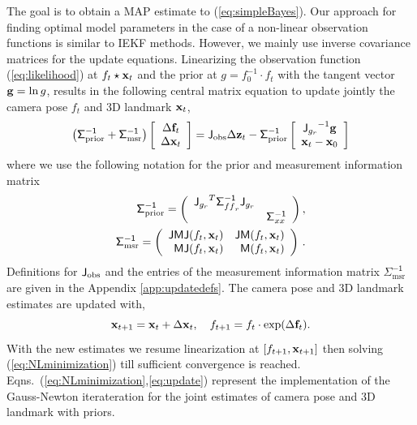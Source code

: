 \documentclass[conference]{IEEEtran}
\newcommand{\meas}{\mathsf{\Sigma^{-1}_\mathrm{msr}}}
\newcommand{\prior}{\mathsf{\Sigma^{-1}_\mathrm{prior}}}
\newcommand{\sigmaff}{\mathsf{\Sigma^{-1}_\mathnormal{{ff}_r}}}
\newcommand{\sigmaxx}{\mathsf{\Sigma^{-1}_\mathnormal{xx}}}
\newcommand{\Jg}{\mathsf{J_\mathnormal{g_r}}}
\newcommand{\JMJ}{\mathsf{JMJ}}
\newcommand{\JM}{\mathsf{JM}}
\newcommand{\MJ}{\mathsf{MJ}}
\newcommand{\beq}{\begin{equation}}
\newcommand{\eeq}{\end{equation}}
\begin{document}
The goal is to obtain a MAP estimate to (\ref{eq:simpleBayes}). Our approach for finding optimal model parameters
in the case of a non-linear observation functions is similar to IEKF methods. However, we mainly use inverse covariance matrices
for the update equations. Linearizing the observation function
(\ref{eq:likelihood}) at $f_t\star {\bf x}_t$ and the prior at $g = f_0^{-1}\cdot f_t$ with the tangent vector ${\bf g} = \ln g$,
results in the following central matrix equation to update jointly the camera pose $f_t$ and 3D landmark ${\bf x}_t$,
\beq
   \left( \prior + \meas \right)
     \left[
    \begin{array}{c}
        \Delta {\bf f}_t \\
        \Delta {\bf x}_t
    \end{array} \right] = 
    {\sf J}_{\rm obs}
    \Delta {\bf z}_t -
    \prior
    \left[ \begin{array}{c}
        \Jg^{-1} {\bf g} \\
        {\bf x}_t-{\bf x}_0
    \end{array} \right] \label{eq:NLminimization}
\eeq
where we use the following notation for the prior and measurement information matrix
\beq\label{eq:NLnotation1}
\begin{split}
   \prior =
    \left(
        \begin{array}{cc}
        \Jg^T \sigmaff \Jg & \\
        & \sigmaxx
    \end{array} \right), \\
    \meas =
    \left(
      \begin{array}{rr}
        \JMJ(f_t,{\bf x}_t) & \JM(f_t,{\bf x}_t) \\
        \MJ(f_t,{\bf x}_t) & {\sf M}(f_t,{\bf x}_t) \\
        \end{array} \right) \, .
\end{split}
\eeq
Definitions for ${\sf J}_{\rm obs}$ and the entries of the measurement information matrix $\meas$
are given in the Appendix \ref{app:updatedefs}. The camera pose and 3D landmark estimates are updated with,
\beq
    {\bf x}_{t+1}={\bf x}_t + \Delta {\bf x}_t,\quad f_{t+1} = f_t \cdot\exp(\Delta {\bf f}_t). \label{eq:update}
\eeq
With the new estimates we resume linearization at $[f_{t+1},{\bf x}_{t+1}]$ then solving (\ref{eq:NLminimization})
till sufficient convergence is reached. Eqns.~(\ref{eq:NLminimization},\ref{eq:update}) represent the implementation of the Gauss-Newton
iterateration for the joint estimates of camera pose and 3D landmark with priors.
\end{document}
